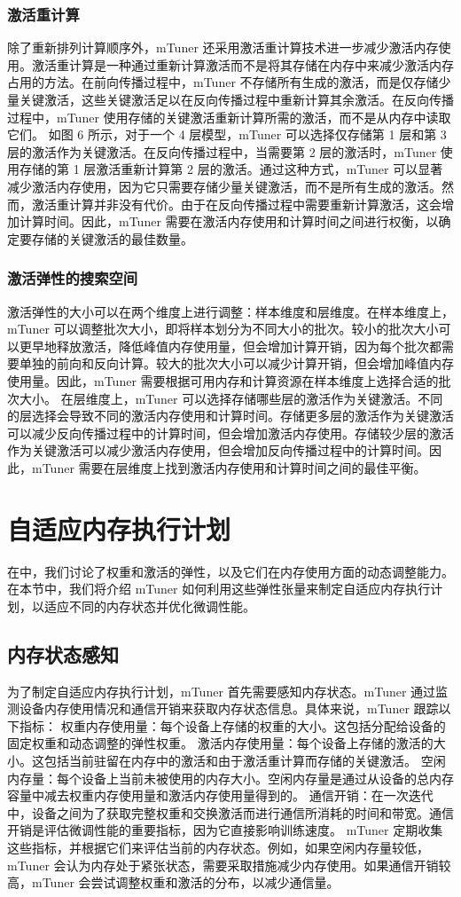 \subsubsection{激活重计算}
除了重新排列计算顺序外，mTuner 还采用激活重计算技术进一步减少激活内存使用。激活重计算是一种通过重新计算激活而不是将其存储在内存中来减少激活内存占用的方法。在前向传播过程中，mTuner 不存储所有生成的激活，而是仅存储少量关键激活，这些关键激活足以在反向传播过程中重新计算其余激活。在反向传播过程中，mTuner 使用存储的关键激活重新计算所需的激活，而不是从内存中读取它们。
如图 6 所示，对于一个 4 层模型，mTuner 可以选择仅存储第 1 层和第 3 层的激活作为关键激活。在反向传播过程中，当需要第 2 层的激活时，mTuner 使用存储的第 1 层激活重新计算第 2 层的激活。通过这种方式，mTuner 可以显著减少激活内存使用，因为它只需要存储少量关键激活，而不是所有生成的激活。然而，激活重计算并非没有代价。由于在反向传播过程中需要重新计算激活，这会增加计算时间。因此，mTuner 需要在激活内存使用和计算时间之间进行权衡，以确定要存储的关键激活的最佳数量。
\subsubsection{激活弹性的搜索空间}
激活弹性的大小可以在两个维度上进行调整：样本维度和层维度。在样本维度上，mTuner 可以调整批次大小，即将样本划分为不同大小的批次。较小的批次大小可以更早地释放激活，降低峰值内存使用量，但会增加计算开销，因为每个批次都需要单独的前向和反向计算。较大的批次大小可以减少计算开销，但会增加峰值内存使用量。因此，mTuner 需要根据可用内存和计算资源在样本维度上选择合适的批次大小。
在层维度上，mTuner 可以选择存储哪些层的激活作为关键激活。不同的层选择会导致不同的激活内存使用和计算时间。存储更多层的激活作为关键激活可以减少反向传播过程中的计算时间，但会增加激活内存使用。存储较少层的激活作为关键激活可以减少激活内存使用，但会增加反向传播过程中的计算时间。因此，mTuner 需要在层维度上找到激活内存使用和计算时间之间的最佳平衡。
\section{自适应内存执行计划}
在中，我们讨论了权重和激活的弹性，以及它们在内存使用方面的动态调整能力。在本节中，我们将介绍 mTuner 如何利用这些弹性张量来制定自适应内存执行计划，以适应不同的内存状态并优化微调性能。
\subsection{内存状态感知}
为了制定自适应内存执行计划，mTuner 首先需要感知内存状态。mTuner 通过监测设备内存使用情况和通信开销来获取内存状态信息。具体来说，mTuner 跟踪以下指标：
权重内存使用量：每个设备上存储的权重的大小。这包括分配给设备的固定权重和动态调整的弹性权重。
激活内存使用量：每个设备上存储的激活的大小。这包括当前驻留在内存中的激活和由于激活重计算而存储的关键激活。
空闲内存量：每个设备上当前未被使用的内存大小。空闲内存量是通过从设备的总内存容量中减去权重内存使用量和激活内存使用量得到的。
通信开销：在一次迭代中，设备之间为了获取完整权重和交换激活而进行通信所消耗的时间和带宽。通信开销是评估微调性能的重要指标，因为它直接影响训练速度。
mTuner 定期收集这些指标，并根据它们来评估当前的内存状态。例如，如果空闲内存量较低，mTuner 会认为内存处于紧张状态，需要采取措施减少内存使用。如果通信开销较高，mTuner 会尝试调整权重和激活的分布，以减少通信量。
